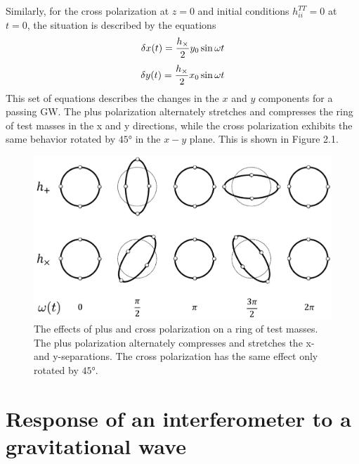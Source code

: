 \documentclass[binding=0.6cm, LaM]{sapthesis}
\begin{document}
        Similarly, for the cross polarization at $z=0$ and initial conditions $h_{ii}^{TT} = 0$ at $t= 0$, the situation is described by the equations
                \begin{equation}
                	\delta x(t) =  {{h_{\times}} \over 2} y_0 \sin \omega t
                \end{equation}
                \begin{equation}
                	\delta y(t) =  {{h_{\times}} \over 2} x_0  \sin \omega t
                \end{equation}
        This set of equations describes the changes in the $x$ and $y$ components for a passing GW.
        The plus polarization alternately stretches and compresses the ring of test masses in the x and y directions,
        while the cross polarization exhibits the same behavior rotated by $\ang{45}$ in the $x - y$ plane. This is shown in Figure 2.1.
                \begin{figure}[H]
                \label{ring}
                \includegraphics[scale=1]{ring}
                \centering
                \caption{The effects of plus and cross polarization on a ring of test masses. The plus polarization alternately compresses and stretches the x- and y-separations. The cross polarization has the same effect only rotated by  $\ang{45}$.}
                \label{fig:ring}
                \end{figure}

\section{Response of an interferometer to a gravitational wave}
\end{document}
